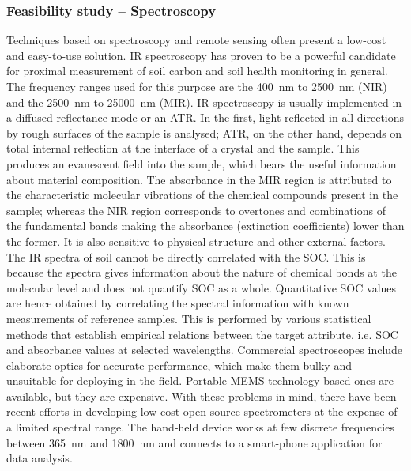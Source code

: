 \subsubsection{Feasibility study -- Spectroscopy }\label{SOC_feasibility}
Techniques based on spectroscopy and remote sensing often present a low-cost and easy-to-use solution. \gls{IR} spectroscopy has proven to be a powerful candidate for proximal measurement of soil carbon and soil health monitoring in general. The frequency ranges used for this purpose are the \SI{400}{nm} to \SI{2500}{nm} (\gls{NIR}) and the \SI{2500}{nm} to \SI{25000}{nm} (\gls{MIR}).\cite{Chatterjee2009, Bellon-Maurel2011, ViscarraRossel2015} \gls{IR} spectroscopy is usually implemented in a diffused reflectance mode or an \gls{ATR}. In the first, light reflected in all directions by rough surfaces of the sample is analysed; \gls{ATR}, on the other hand, depends on total internal reflection at the interface of a crystal and the sample. This produces an evanescent field into the sample, which bears the useful information about material composition. The absorbance in the \gls{MIR} region is attributed to the characteristic molecular vibrations of the chemical compounds present in the sample; whereas the \gls{NIR} region corresponds to overtones and combinations of the fundamental bands making the absorbance (extinction coefficients) lower than the former. It is also sensitive to physical structure and other external factors.\cite{Bellon-Maurel2011} The \gls{IR} spectra of soil cannot be directly correlated with the \gls{SOC}. This is because the spectra gives information about the nature of chemical bonds at the molecular level and does not quantify \gls{SOC} as a whole. Quantitative \gls{SOC} values are hence obtained by correlating the spectral information with known measurements of reference samples. This is performed by various statistical methods that establish empirical relations between the target attribute, i.e. \gls{SOC} and absorbance values at selected wavelengths. Commercial spectroscopes include elaborate optics for accurate performance, which make them bulky and unsuitable for deploying in the field. Portable \gls{MEMS} technology based ones are available, but they are expensive. With these problems in mind, there have been recent efforts in developing low-cost open-source spectrometers at the expense of a limited spectral range.\cite{oursci_blog} The hand-held device works at few discrete frequencies between \SI{365}{nm} and \SI{1800}{nm} and connects to a smart-phone application for data analysis.

